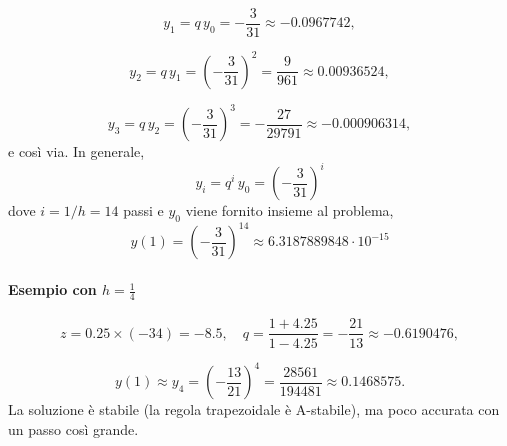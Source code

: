 \documentclass[11pt]{article}
\begin{document}
\[
y_1 = q \, y_0 = -\frac{3}{31} \approx -0.0967742,
\]

\[
y_2 = q \, y_1 = \left(-\frac{3}{31}\right)^2 = \frac{9}{961} \approx 0.00936524,
\]

\[
y_3 = q \, y_2 = \left(-\frac{3}{31}\right)^3 = -\frac{27}{29791} \approx -0.000906314,
\]
e così via. In generale,
\[
y_i = q^i \, y_0 = \left(-\frac{3}{31}\right)^i
\]
dove $i=1/h=14$ passi e $y_0$ viene fornito insieme al problema,
\[
y(1)=\left(-\frac{3}{31}\right)^{14}\approx6.3187889848\cdot10^{-15}
\]
\paragraph{Esempio con $h=\frac{1}{4}$}
\[
z = 0.25 \times (-34) = -8.5,
\quad
q = \frac{1 + 4.25}{1 - 4.25} = -\frac{21}{13} \approx -0.6190476,
\]

\[
y(1) \approx y_4 = \left(-\frac{13}{21}\right)^4 = \frac{28561}{194481} \approx 0.1468575.
\]
La soluzione è stabile (la regola trapezoidale è A-stabile), ma poco accurata con un passo così grande.
\end{document}
